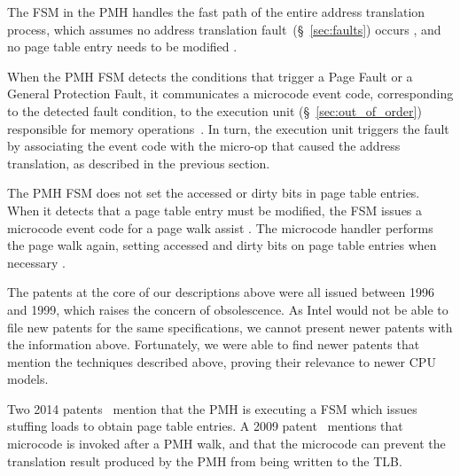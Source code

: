 The FSM in the PMH handles the fast path of the entire address translation
process, which assumes no address translation fault~(\S~\ref{sec:faults})
occurs
\cite{intel1996dtlb, intel1997pmh, intel1999exceptions, intel1999events}, and
no page table entry needs to be modified \cite{intel1997pmh}.

When the PMH FSM detects the conditions that trigger a Page Fault or a General
Protection Fault, it communicates a microcode event code, corresponding to the
detected fault condition, to the execution unit (\S~\ref{sec:out_of_order})
responsible for memory operations~\cite{intel1996dtlb, intel1997pmh,
intel1999exceptions, intel1999events}. In turn, the execution unit triggers the
fault by associating the event code with the micro-op that caused the address
translation, as described in the previous section.

The PMH FSM does not set the accessed or dirty bits in page table entries. When
it detects that a page table entry must be modified, the FSM issues a microcode
event code for a page walk assist \cite{intel1997pmh}. The microcode handler
performs the page walk again, setting accessed and dirty bits on page table
entries when necessary \cite{intel1997pmh}.

The patents at the core of our descriptions above \cite{intel1996dtlb,
intel1997events, intel1997pmh, intel1999exceptions, intel1999events} were all
issued between 1996 and 1999, which raises the concern of obsolescence. As
Intel would not be able to file new patents for the same specifications, we
cannot present newer patents with the information above. Fortunately, we were
able to find newer patents that mention the techniques described above,
proving their relevance to newer CPU models.


Two 2014 patents~\cite{hildesheim2014ptm, raikin2014tlb} mention that the PMH
is executing a FSM which issues stuffing loads to obtain page table entries.
A 2009 patent~\cite{intel2009pipeline} mentions that microcode is invoked after
a PMH walk, and that the microcode can prevent the translation result produced
by the PMH from being written to the TLB.


